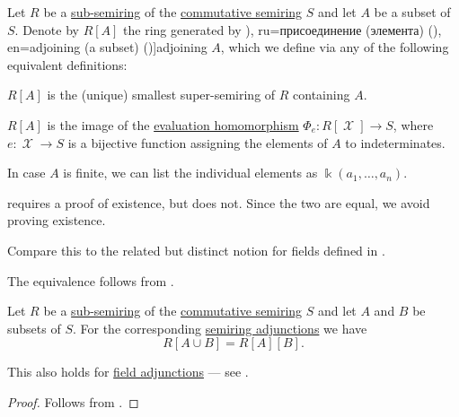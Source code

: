 \begin{definition}\label{def:semiring_adjunction}
  Let \( R \) be a \hyperref[def:ring/submodel]{sub-semiring} of the \hyperref[def:semiring/commutative]{commutative semiring} \( S \) and let \( A \) be a subset of \( S \). Denote by \( R[A] \) the ring generated by \term[bg=присъединяване/адюнгиране (на елемент) (\cite[425]{Обрешков1962ВисшаАлгебра}), ru=присоединение (элемента) (\cite[288]{Курош1968КурсВысшейАлгебры}), en=adjoining (a subset) (\cite[119]{Jacobson1985BasicAlgebraI})]{adjoining} \( A \), which we define via any of the following equivalent definitions:
  \begin{thmenum}
     \( R[A] \) is the (unique) smallest super-semiring of \( R \) containing \( A \).

     \( R[A] \) is the image of the \hyperref[con:evaluation_homomorphism]{evaluation homomorphism} \( \Phi_e: R[\mscrX] \to S \), where \( e: \mscrX \to S \) is a bijective function assigning the elements of \( A \) to indeterminates.
  \end{thmenum}

  In case \( A \) is finite, we can list the individual elements as \( \Bbbk(a_1, \ldots, a_n) \).
\end{definition}
\begin{comments}
  \item {} requires a proof of existence, but  does not. Since the two are equal, we avoid proving existence.
  \item Compare this to the related but distinct notion for fields defined in .
\end{comments}
\begin{defproof}
  The equivalence follows from .
\end{defproof}

\begin{proposition}\label{thm:semiring_adjunction_tower}
  Let \( R \) be a \hyperref[def:ring/submodel]{sub-semiring} of the \hyperref[def:semiring/commutative]{commutative semiring} \( S \) and let \( A \) and \( B \) be subsets of \( S \). For the corresponding \hyperref[def:semiring_adjunction]{semiring adjunctions} we have
  \begin{equation*}
    R[A \cup B] = R[A][B].
  \end{equation*}
\end{proposition}
\begin{comments}
  \item This also holds for \hyperref[def:field_adjunction]{field adjunctions} --- see .
\end{comments}
\begin{proof}
  Follows from .
\end{proof}

